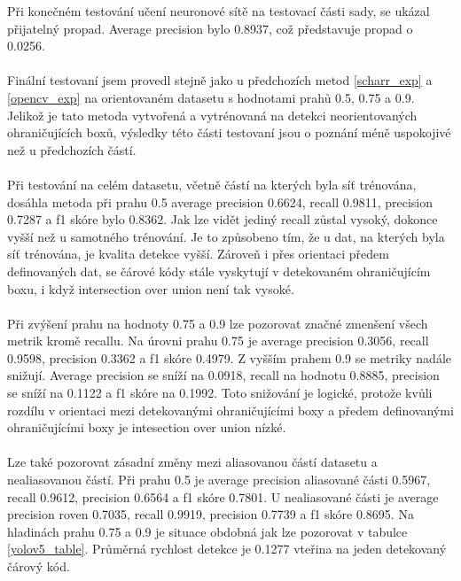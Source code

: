 Při konečném testování učení neuronové sítě na testovací části sady, se ukázal přijatelný propad. Average precision bylo 0.8937, což představuje propad o 0.0256. 

\paragraph{} Finální testovaní jsem provedl stejně jako u předchozích metod \ref{scharr_exp} a \ref{opencv_exp} na orientovaném datasetu s hodnotami prahů 0.5, 0.75 a 0.9. Jelikož je tato metoda vytvořená a vytrénovaná na detekci neorientovaných ohraničujících boxů, výsledky této části testovaní jsou o poznání méně uspokojivé než u předchozích částí.
\paragraph{} Při testování na celém datasetu, včetně částí na kterých byla síť trénována, dosáhla metoda při prahu 0.5 average precision 0.6624, recall 0.9811, precision 0.7287 a f1 skóre bylo 0.8362. Jak lze vidět jediný recall zůstal vysoký, dokonce vyšší než u samotného trénování. Je to způsobeno tím, že u dat, na kterých byla síť trénována, je kvalita detekce vyšší. Zároveň i přes orientaci předem definovaných dat, se čárové kódy stále vyskytují v detekovaném ohraničujícím boxu, i když intersection over union není tak vysoké.
\paragraph{} Při zvýšení prahu na hodnoty 0.75 a 0.9 lze pozorovat značné zmenšení všech metrik kromě recallu. Na úrovni prahu 0.75 je average precision 0.3056, recall 0.9598, precision 0.3362 a f1 skóre  0.4979. Z vyšším prahem 0.9 se metriky nadále snižují. Average precision se sníží na 0.0918, recall na hodnotu 0.8885, precision se sníží na 0.1122 a f1 skóre na 0.1992. Toto snižování je logické, protože kvůli rozdílu v orientaci mezi detekovanými ohraničujícími boxy a předem definovanými ohraničujícími boxy je intesection over union nízké.
\paragraph{} Lze také pozorovat zásadní změny mezi aliasovanou částí datasetu a nealiasovanou částí. Při prahu 0.5 je average precision aliasované části 0.5967, recall 0.9612, precision 0.6564 a f1 skóre 0.7801. U nealiasované části je average precision roven 0.7035, recall  0.9919, precision 0.7739 a f1 skóre 0.8695. Na hladinách prahu 0.75 a 0.9 je situace obdobná jak lze pozorovat v tabulce \ref{yolov5_table}. Průměrná rychlost detekce je 0.1277 vteřina na jeden detekovaný čárový kód.


